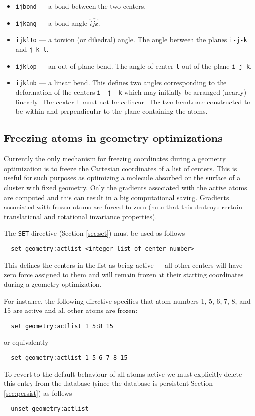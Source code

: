 \begin{itemize}
\item {\tt ijbond} --- a bond between the two centers.
\item {\tt ijkang} --- a bond angle $\widehat{ijk}$.
\item {\tt ijklto} --- a torsion (or dihedral) angle.  The
  angle between the planes \verb+i-j-k+ and \verb+j-k-l+.
\item {\tt ijklop} --- an out-of-plane bend.  The angle of center
  \verb+l+ out of the plane \verb+i-j-k+.
\item {\tt ijklnb} --- a linear bend.  This defines two angles
  corresponding to the deformation of the centers \verb+i--j--k+ 
  which may initially be arranged (nearly) linearly.  The center
  \verb+l+ must not be colinear.  The two bends are constructed to be
  within and perpendicular to the plane containing the atoms.
\end{itemize}   

\subsection{Freezing atoms in geometry optimizations}
\label{sec:activeatoms}

Currently the only mechanism for freezing coordinates during a
geometry optimization is to freeze the Cartesian coordinates of a list
of centers.  This is useful for such purposes as optimizing a molecule
absorbed on the surface of a cluster with fixed geometry.  Only the
gradients associated with the active atoms are computed and this can
result in a big computational saving.  Gradients associated with
frozen atoms are forced to zero (note that this destroys certain
translational and rotational invariance properties).

The \verb+SET+ directive (Section \ref{sec:set}) must be used as
follows
\begin{verbatim}
  set geometry:actlist <integer list_of_center_number>
\end{verbatim}
This defines the centers in the list as being active --- all other
centers will have zero force assigned to them and will remain frozen
at their starting coordinates during a geometry optimization.

For instance, the following directive specifies that atom numbers 1,
5, 6, 7, 8, and 15 are active and all other atoms are frozen:
\begin{verbatim}
  set geometry:actlist 1 5:8 15
\end{verbatim}
or equivalently
\begin{verbatim}
  set geometry:actlist 1 5 6 7 8 15
\end{verbatim}


To revert to the default behaviour of all atoms active we
must explicitly delete this entry from the database (since
the database is persistent Section \ref{sec:persist}) as follows
\begin{verbatim}
  unset geometry:actlist
\end{verbatim}




